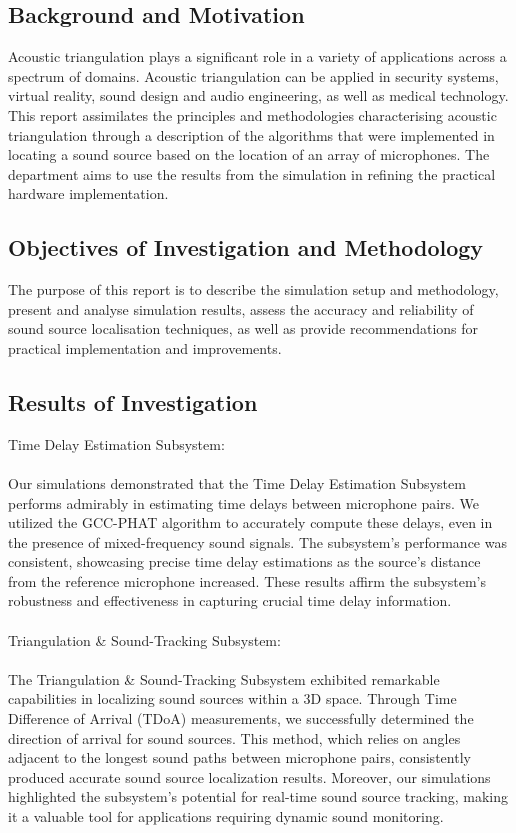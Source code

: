 \documentclass[a4paper,11pt]{article}
\begin{document}
\subsection*{Background and Motivation}
Acoustic triangulation plays a significant role in a variety of applications across a spectrum of domains. Acoustic triangulation can be applied in security systems, virtual reality, sound design and audio engineering, as well as medical technology. This report assimilates the principles and methodologies characterising acoustic triangulation through a description of the algorithms that were implemented in locating a sound source based on the location of an array of microphones. The department aims to use the results from the simulation in refining the practical hardware implementation. 

\subsection*{Objectives of Investigation and Methodology}
The purpose of this report is to describe the simulation setup and methodology, present and analyse simulation results, assess the accuracy and reliability of sound source localisation techniques, as well as provide recommendations for practical implementation and improvements.

\subsection*{Results of Investigation}

Time Delay Estimation Subsystem:\\\\
Our simulations demonstrated that the Time Delay Estimation Subsystem performs admirably in estimating time delays between microphone pairs. We utilized the GCC-PHAT algorithm to accurately compute these delays, even in the presence of mixed-frequency sound signals. The subsystem's performance was consistent, showcasing precise time delay estimations as the source's distance from the reference microphone increased. These results affirm the subsystem's robustness and effectiveness in capturing crucial time delay information.\\\\
Triangulation \& Sound-Tracking Subsystem:\\\\
The Triangulation \& Sound-Tracking Subsystem exhibited remarkable capabilities in localizing sound sources within a 3D space. Through Time Difference of Arrival (TDoA) measurements, we successfully determined the direction of arrival for sound sources. This method, which relies on angles adjacent to the longest sound paths between microphone pairs, consistently produced accurate sound source localization results. Moreover, our simulations highlighted the subsystem's potential for real-time sound source tracking, making it a valuable tool for applications requiring dynamic sound monitoring.
  
\end{document}
